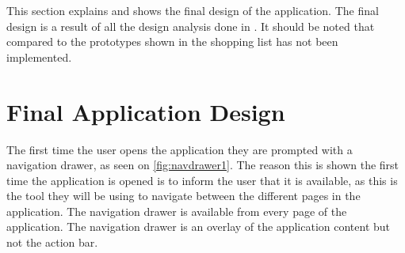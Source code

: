 This section explains and shows the final design of the application. The final design is a result of all the design analysis done in . It should be noted that compared to the prototypes shown in  the shopping list has not been implemented.

\section{Final Application Design}
The first time the user opens the application they are prompted with a navigation drawer, as seen on \autoref{fig:navdrawer1}. The reason this is shown the first time the application is opened is to inform the user that it is available, as this is the tool they will be using to navigate between the different pages in the application. The navigation drawer is available from every page of the application. The navigation drawer is an overlay of the application content but not the action bar\citep{guidelines-navigationdrawer}.

